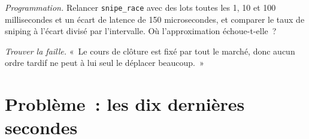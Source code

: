 \begin{exercise}[$\star\star\star$]\label{exo:mx:auction-mechanics-and-theory:7}
\emph{Programmation.} Relancer \texttt{snipe\_race} avec des lots toutes les 1, 10 et 100 millisecondes et un écart de latence de 150 microsecondes, et comparer le taux de sniping
à l'écart divisé par l'intervalle. Où l'approximation échoue-t-elle~?
\end{exercise}

\begin{exercise}[$\star\star\star$]\label{exo:mx:auction-mechanics-and-theory:8}
\emph{Trouver la faille.} «~Le cours de clôture est fixé par tout le marché, donc aucun ordre tardif ne peut à lui seul le déplacer beaucoup.~»
\end{exercise}

\section{Problème~: les dix dernières secondes}

